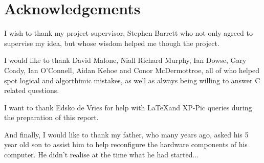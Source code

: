 
\section{Acknowledgements}

I wish to thank my project supervisor, Stephen Barrett who not only
agreed to supervise my idea, but whose wisdom helped me though the
project.


I would like to thank David Malone, Niall Richard Murphy, Ian Dowse, 
Gary Coady, Ian O'Connell, Aidan Kehoe and Conor McDermottroe, all of 
who helped spot logical and algorthimic mistakes, as well as always
being willing to answer C related questions.


I want to thank Edsko de Vries for help with \LaTeX and XP-Pic queries
during the preparation of this report.



And finally, I would like to thank my father, who many years ago, asked
his 5 year old son to assist him to help reconfigure the hardware 
components of his computer. He didn't realise at the time what he had 
started...
